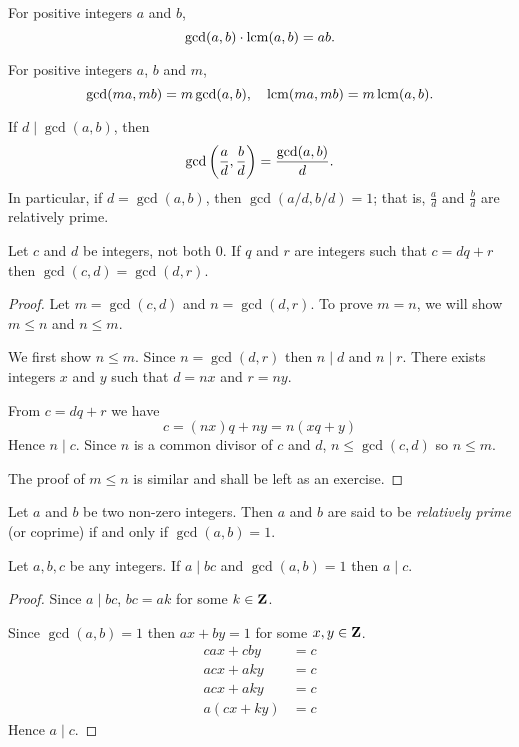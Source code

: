 \begin{lemma}
For positive integers $a$ and $b$,
\[\gcd(a,b)\cdot\operatorname*{lcm}(a,b)=ab.\]
\end{lemma}

\begin{proposition}
For positive integers $a$, $b$ and $m$,
\[\gcd(ma,mb)=m\gcd(a,b),\quad\operatorname*{lcm}(ma,mb)=m\operatorname*{lcm}(a,b).\]
\end{proposition}

\begin{proposition}
If $d\mid\gcd(a,b)$, then
\[\gcd\left(\frac{a}{d},\frac{b}{d}\right)=\frac{\gcd(a,b)}{d}.\]
In particular, if $d=\gcd(a,b)$, then $\gcd(a/d,b/d)=1$; that is, $\frac{a}{d}$ and $\frac{b}{d}$ are relatively prime.
\end{proposition}

\begin{lemma}
Let $c$ and $d$ be integers, not both $0$. If $q$ and $r$ are integers such that $c=dq+r$ then $\gcd(c,d)=\gcd(d,r)$.
\end{lemma}

\begin{proof}
Let $m=\gcd(c,d)$ and $n=\gcd(d,r)$. To prove $m=n$, we will show $m\le n$ and $n\le m$.

We first show $n\le m$. Since $n=\gcd(d,r)$ then $n\mid d$ and $n\mid r$. There exists integers $x$ and $y$ such that $d=nx$ and $r=ny$.

From $c=dq+r$ we have
\[c=(nx)q+ny=n(xq+y)\]
Hence $n\mid c$. Since $n$ is a common divisor of $c$ and $d$, $n\le\gcd(c,d)$ so $n\le m$.

The proof of $m\le n$ is similar and shall be left as an exercise.
\end{proof}

Let $a$ and $b$ be two non-zero integers. Then $a$ and $b$ are said to be \emph{relatively prime} (or coprime) if and only if $\gcd(a,b)=1$.

\begin{lemma}\label{lemma:euclid_lemma}
Let $a,b,c$ be any integers. If $a\mid bc$ and $\gcd(a,b)=1$ then $a\mid c$.
\end{lemma}

\begin{proof}
Since $a\mid bc$, $bc=ak$ for some $k\in\mathbf Z$.

Since $\gcd(a,b)=1$ then $ax+by=1$ for some $x,y\in\mathbf Z$.
\begin{align*}
cax+cby &= c \\
acx+aky &= c \\
acx+aky &= c \\
a(cx+ky) &= c
\end{align*}
Hence $a\mid c$.
\end{proof}

